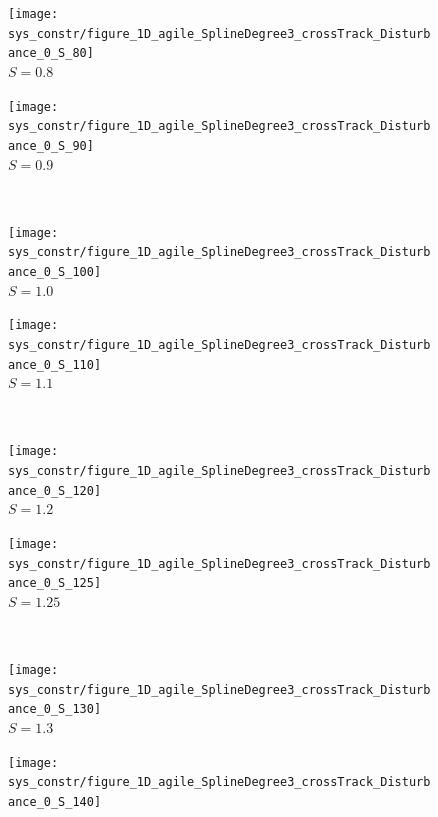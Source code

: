 \begin{figure}[H]
  \centering
  \begin{minipage}[t]{0.48\textwidth}
    \centering
    \texttt{[image: sys\_constr/figure\_1D\_agile\_SplineDegree3\_crossTrack\_Disturbance\_0\_S\_80]}
  \\ $S=0.8$
  \end{minipage}
  \begin{minipage}[t]{0.48\textwidth}
    \centering
    \texttt{[image: sys\_constr/figure\_1D\_agile\_SplineDegree3\_crossTrack\_Disturbance\_0\_S\_90]}
  \\ $S=0.9$
  \end{minipage} \\ \hspace{5pt}
  \begin{minipage}[t]{0.48\textwidth}
    \centering
    \texttt{[image: sys\_constr/figure\_1D\_agile\_SplineDegree3\_crossTrack\_Disturbance\_0\_S\_100]}
  \\ $S=1.0$
  \end{minipage}
  \begin{minipage}[t]{0.48\textwidth}
    \centering
    \texttt{[image: sys\_constr/figure\_1D\_agile\_SplineDegree3\_crossTrack\_Disturbance\_0\_S\_110]}
  \\ $S=1.1$
  \end{minipage}\\ \hspace{5pt}
  \begin{minipage}[t]{0.48\textwidth}
    \centering
    \texttt{[image: sys\_constr/figure\_1D\_agile\_SplineDegree3\_crossTrack\_Disturbance\_0\_S\_120]}
  \\ $S=1.2$
  \end{minipage}
  \begin{minipage}[t]{0.48\textwidth}
    \centering
    \texttt{[image: sys\_constr/figure\_1D\_agile\_SplineDegree3\_crossTrack\_Disturbance\_0\_S\_125]}
  \\ $S=1.25$
  \end{minipage}\\ \hspace{5pt}
  \begin{minipage}[t]{0.48\textwidth}
    \centering
    \texttt{[image: sys\_constr/figure\_1D\_agile\_SplineDegree3\_crossTrack\_Disturbance\_0\_S\_130]}
  \\ $S=1.3$
  \end{minipage}
  \begin{minipage}[t]{0.48\textwidth}
    \centering
    \texttt{[image: sys\_constr/figure\_1D\_agile\_SplineDegree3\_crossTrack\_Disturbance\_0\_S\_140]}

\end{minipage}
\end{figure}

